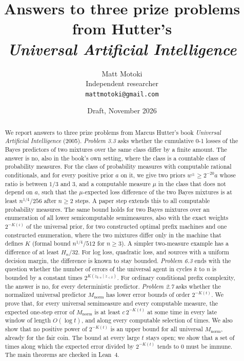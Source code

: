 \documentclass[11pt]{article}
\title{Answers to three prize problems from Hutter's\\ \emph{Universal Artificial Intelligence}}
\author{Matt Motoki\\
Independent researcher\\
\texttt{mattmotoki@gmail.com}}
\date{Draft, November 2026}
\newcommand{\Mnorm}{M_{\mathrm{norm}}}
\theoremstyle{definition}
\theoremstyle{remark}
\begin{document}
\maketitle

\begin{abstract}
We report answers to three prize problems from Marcus Hutter's book
\emph{Universal Artificial Intelligence} (2005).
\emph{Problem 3.3} asks whether the cumulative 0-1 losses of the Bayes
predictors of two mixtures over the same class differ by a finite amount.
The answer is no, also in the book's own setting, where the class is a
countable class of probability measures. For the class of probability
measures with computable rational conditionals, and for every positive prior
$a$ on it, we give two priors $w^\pm\ge2^{-20}a$ whose ratio is between $1/3$
and $3$, and a computable measure $\mu$ in the class that does not depend on
$a$, such that the $\mu$-expected loss difference of the two Bayes mixtures is
at least $n^{1/4}/256$ after $n\ge2$ steps. A paper step extends this to all
computable probability measures. The same bound holds for two Bayes mixtures
over an enumeration of all lower semicomputable semimeasures, also with the
exact weights $2^{-K(i)}$ of the universal prior, for two constructed optimal
prefix machines and one constructed enumeration, where the two mixtures differ
only in the machine that defines $K$ (formal bound $n^{1/4}/512$ for $n\ge3$). A simpler two-measure example has a difference of
at least $H_n/32$. For log loss, quadratic loss, and sources with a uniform
decision margin, the difference is known to stay bounded.
\emph{Problem 6.3} ends with the question whether the number of errors of the
universal agent in cycles $k$ to $n$ is bounded by a constant times
$2^{K(\dot z_{k:n}\mid \dot z_{<k})}$. For ordinary conditional prefix
complexity, the answer is no, for every deterministic predictor.
\emph{Problem 2.7} asks whether the normalized universal predictor $\Mnorm$
has lower error bounds of order $2^{-K(t)}$. We prove that, for every
universal semimeasure and every computable measure, the expected one-step error
of $\Mnorm$ is at least $c\,2^{-K(t)}$ at some time in every late window of
length $O(\log t)$, and along every computable selection of times. We also
show that no positive power of $2^{-K(t)}$ is an upper bound for all universal
$\Mnorm$, already for the fair coin. The bound at every large $t$ stays open;
we show that a set of times along which the expected error divided by
$2^{-K(t)}$ tends to $0$ must be immune.
The main theorems are checked in Lean~4.
\end{abstract}
\end{document}
